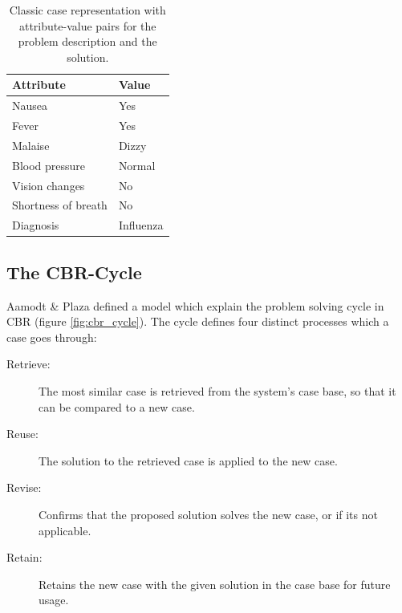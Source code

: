\begin{table}[H]
\centering
\caption{Classic case representation with attribute-value pairs for the problem description and the solution.}
\label{tab:example_case}
\begin{tabular}{|l|l|}
\hline
\rowcolor[HTML]{C0C0C0} 
Attribute           & Value     \\ \hline
Nausea              & Yes       \\ \hline
Fever               & Yes       \\ \hline
Malaise             & Dizzy     \\ \hline
Blood pressure      & Normal    \\ \hline
Vision changes      & No        \\ \hline
Shortness of breath & No        \\ \hline
Diagnosis           & Influenza \\ \hline
\end{tabular}
\end{table}

\subsection{The CBR-Cycle}\label{sec:cbr-cycle}

Aamodt & Plaza\cite{aamodt1994case} defined a model which explain the problem solving cycle in CBR (figure \ref{fig:cbr_cycle}). The cycle defines four distinct processes which a case goes through:

\begin{description}
\item [Retrieve:] The most similar case is retrieved from the system's case base, so that it can be compared to a new case.
\item [Reuse:] The solution to the retrieved case is applied to the new case.
\item [Revise:] Confirms that the proposed solution solves the new case, or if its not applicable.
\item [Retain:] Retains the new case with the given solution in the case base for future usage.
\end{description}

